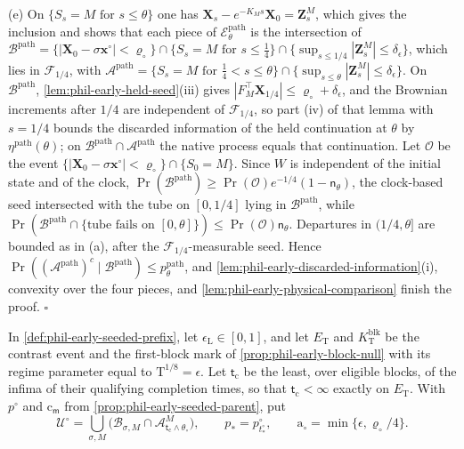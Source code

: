 (e) On \(\{S_s=M\text{ for }s\le\theta\}\) one has
\(\mathbf X_s-e^{-K_Ms}\mathbf X_0=\mathbf Z^M_s\), which gives the inclusion
and shows that each piece of \(\mathscr E^{\mathrm{path}}_\theta\) is the
intersection of
\(\mathscr B^{\mathrm{path}}=\{|\mathbf X_0-\sigma\mathbf x^\circ|<\varrho_\circ\}
\cap\{S_s=M\text{ for }s\le\frac14\}\cap\{\sup_{s\le1/4}|\mathbf Z^M_s|\le\delta_\epsilon\}\),
which lies in \(\mathcal F_{1/4}\), with
\(\mathscr A^{\mathrm{path}}=\{S_s=M\text{ for }\frac14<s\le\theta\}\cap
\{\sup_{s\le\theta}|\mathbf Z^M_s|\le\delta_\epsilon\}\). On
\(\mathscr B^{\mathrm{path}}\), \cref{lem:phil-early-held-seed}(iii) gives
\(|F_M^\top\mathbf X_{1/4}|\le\varrho_\circ+\delta_\epsilon\), and the Brownian
increments after \(1/4\) are independent of \(\mathcal F_{1/4}\), so part
(iv) of that lemma with \(s=1/4\) bounds the discarded information of the held
continuation at \(\theta\) by \(\eta^{\mathrm{path}}(\theta)\); on
\(\mathscr B^{\mathrm{path}}\cap\mathscr A^{\mathrm{path}}\) the native
process equals that continuation. Let \(\mathscr O\) be the event
\(\{|\mathbf X_0-\sigma\mathbf x^\circ|<\varrho_\circ\}\cap\{S_0=M\}\). Since
\(W\) is independent of the initial state and of the clock,
\(\Pr(\mathscr B^{\mathrm{path}})\ge\Pr(\mathscr O)e^{-1/4}(1-\mathsf n_\theta)\),
the clock-based seed intersected with the tube on \([0,1/4]\) lying in
\(\mathscr B^{\mathrm{path}}\), while
\(\Pr(\mathscr B^{\mathrm{path}}\cap\{\text{tube fails on }[0,\theta]\})
\le\Pr(\mathscr O)\mathsf n_\theta\). Departures in \((1/4,\theta]\) are bounded
as in (a), after the \(\mathcal F_{1/4}\)-measurable seed. Hence
\(\Pr((\mathscr A^{\mathrm{path}})^c\mid\mathscr B^{\mathrm{path}})
\le p^{\mathrm{path}}_\theta\), and
\cref{lem:phil-early-discarded-information}(i), convexity over the four
pieces, and \cref{lem:phil-early-physical-comparison} finish the proof.
\(\square\)

In \cref{def:phil-early-seeded-prefix}, let \(\epsilon_{\mathrm L}\in[0,1]\),
and let \(E_{\mathrm T}\) and \(K^{\mathrm{blk}}_{\mathrm T}\) be the contrast event and the
first-block mark of \cref{prop:phil-early-block-null} with its regime
parameter equal to \(\mathrm T^{1/8}=\epsilon\). Let \(\mathsf t_{\mathrm c}\)
be the least, over eligible blocks, of the infima of their qualifying
completion times, so that \(\mathsf t_{\mathrm c}<\infty\) exactly on
\(E_{\mathrm T}\). With \(p^\circ\) and \(\mathrm c_{\mathsf m}\) from
\cref{prop:phil-early-seeded-parent}, put
\[
 \mathscr U^\circ=\bigcup_{\sigma,M}\bigl(\mathscr B_{\sigma,M}\cap
 \mathscr A^M_{\mathsf t_{\mathrm c}\wedge\theta_\circ}\bigr),
 \qquad
 p_*=p^\circ_{t^\circ_*},
 \qquad
 \mathrm a_\circ=\min\{\epsilon,\varrho_\circ/4\}.
\]

